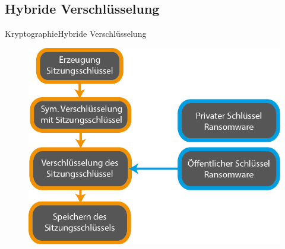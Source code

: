 \documentclass[10pt]{beamer}
\begin{document}
\subsection{Hybride Verschlüsselung}
\begin{frame}{Kryptographie}{Hybride Verschlüsselung}
	\begin{figure}[]
		\centering
		\includegraphics[width=.6\linewidth]{hybride_Verschluesselung.png}
	\end{figure}
\end{frame}
\end{document}
